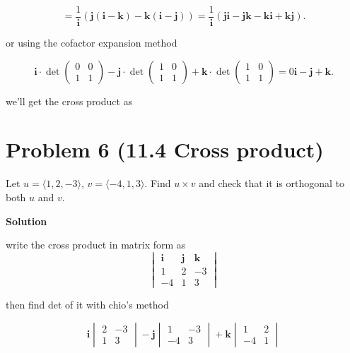 \documentclass{article}
\newcommand{\solution}{\textbf{\large Solution}}
\theoremstyle{remark}
\begin{document}
\[
    =
    \frac{1}{\mathbf{i}}
    \left(
        \mathbf{j}(\mathbf{i} - \mathbf{k}) - \mathbf{k}(\mathbf{i} - \mathbf{j})
    \right)
    =
    \frac{1}{\mathbf{i}}
    \left(
        \mathbf{j}\mathbf{i} - \mathbf{j}\mathbf{k} - \mathbf{k}\mathbf{i} + \mathbf{k}\mathbf{j}
    \right).
\]

or using the cofactor expansion method

\[
  \mathbf{i} \cdot \det\begin{pmatrix}0&0\\1&1\end{pmatrix}
  -\mathbf{j} \cdot \det\begin{pmatrix}1&0\\1&1\end{pmatrix}
  +\mathbf{k} \cdot \det\begin{pmatrix}1&0\\1&1\end{pmatrix}
  =0\mathbf{i} -\mathbf{j} + \mathbf{k}.
\]

we'll get the cross product as 

\vspace{1em}
\hrulefill

\section*{Problem 6 (11.4 Cross product)}
Let $u = \langle 1, 2, -3 \rangle$, $v = \langle -4, 1, 3 \rangle$. Find $u \times v$ and check that it is orthogonal to both $u$ and $v$.

\medskip
\solution

write the cross product in matrix form as
  \[
      \begin{vmatrix}
          \mathbf{i} & \mathbf{j} & \mathbf{k} \\
          1 & 2 & -3 \\
          -4 & 1 & 3
      \end{vmatrix}
  \]

  then find det of it with chio's method

  \[
      \mathbf{i}
      \begin{vmatrix}
          2 & -3 \\
          1 & 3
      \end{vmatrix}
      - \mathbf{j}
      \begin{vmatrix}
          1 & -3 \\
          -4 & 3
      \end{vmatrix}
      + \mathbf{k}
      \begin{vmatrix}
          1 & 2 \\
          -4 & 1
      \end{vmatrix}
  \]
\end{document}
